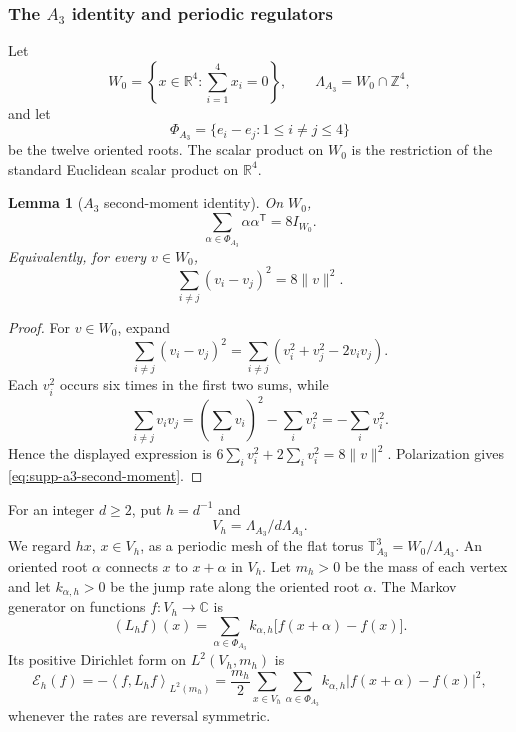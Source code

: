 \documentclass[11pt]{article}
\numberwithin{equation}{section}
\newtheorem{lemma}[lemma]{Lemma}
\theoremstyle{definition}
\theoremstyle{remark}
\newcommand{\Z}{\mathbb Z}
\newcommand{\R}{\mathbb R}
\newcommand{\C}{\mathbb C}
\newcommand{\norm}[1]{\lVert#1\rVert}
\newcommand{\abs}[1]{\lvert#1\rvert}
\newcommand{\ip}[2]{\left\langle #1,#2\right\rangle}
\begin{document}
\subsubsection{The \texorpdfstring{$A_3$}{A3} identity and periodic regulators}

Let
\begin{equation}
 W_0=\left\{x\in\R^4:\sum_{i=1}^4x_i=0\right\},
 \qquad
 \Lambda_{A_3}=W_0\cap\Z^4,
 \label{eq:supp-a3-lattice}
\end{equation}
and let
\begin{equation}
 \Phi_{A_3}=\{e_i-e_j:1\le i\ne j\le4\}
 \label{eq:supp-a3-oriented-roots}
\end{equation}
be the twelve oriented roots.  The scalar product on $W_0$ is the restriction
of the standard Euclidean scalar product on $\R^4$.

\begin{lemma}[$A_3$ second-moment identity]
\label{lem:supp-a3-second-moment}
On $W_0$,
\begin{equation}
 \sum_{\alpha\in\Phi_{A_3}}
        \alpha\alpha^{\mathsf T}=8I_{W_0}.
 \label{eq:supp-a3-second-moment}
\end{equation}
Equivalently, for every $v\in W_0$,
\begin{equation}
 \sum_{i\ne j}(v_i-v_j)^2=8\norm{v}^2.
 \label{eq:supp-a3-quadratic-identity}
\end{equation}
\end{lemma}

\begin{proof}
For $v\in W_0$, expand
\[
 \sum_{i\ne j}(v_i-v_j)^2
 =\sum_{i\ne j}(v_i^2+v_j^2-2v_iv_j).
\]
Each $v_i^2$ occurs six times in the first two sums, while
\[
 \sum_{i\ne j}v_iv_j
 =\left(\sum_i v_i\right)^2-\sum_i v_i^2
 =-\sum_i v_i^2.
\]
Hence the displayed expression is
$6\sum_i v_i^2+2\sum_i v_i^2=8\norm{v}^2$.
Polarization gives \eqref{eq:supp-a3-second-moment}.
\end{proof}

For an integer $d\ge2$, put $h=d^{-1}$ and
\begin{equation}
 V_h=\Lambda_{A_3}/d\Lambda_{A_3}.
 \label{eq:supp-periodic-vertices}
\end{equation}
We regard $hx$, $x\in V_h$, as a periodic mesh of the flat torus
$\mathbb T^3_{A_3}=W_0/\Lambda_{A_3}$.  An oriented root $\alpha$ connects
$x$ to $x+\alpha$ in $V_h$.  Let $m_h>0$ be the mass of each vertex and let
$k_{\alpha,h}>0$ be the jump rate along the oriented root $\alpha$.  The
Markov generator on functions $f:V_h\to\C$ is
\begin{equation}
 (L_hf)(x)
 =\sum_{\alpha\in\Phi_{A_3}}k_{\alpha,h}
  \bigl[f(x+\alpha)-f(x)\bigr].
 \label{eq:supp-root-generator}
\end{equation}
Its positive Dirichlet form on
$L^2(V_h,m_h)$ is
\begin{equation}
 \mathcal E_h(f)
 =-\ip{f}{L_hf}_{L^2(m_h)}
 =\frac{m_h}{2}\sum_{x\in V_h}
   \sum_{\alpha\in\Phi_{A_3}}k_{\alpha,h}
   \abs{f(x+\alpha)-f(x)}^2,
 \label{eq:supp-root-form}
\end{equation}
whenever the rates are reversal symmetric.
\end{document}
